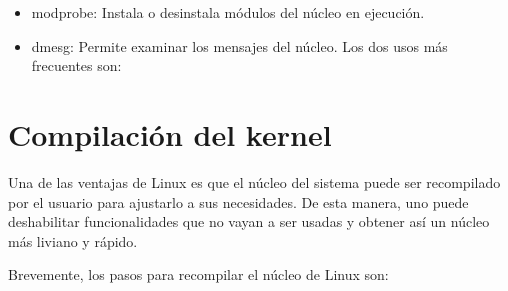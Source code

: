 \documentclass[12pt,a4paper,spanish]{article}
\begin{document}
\begin{itemize}
\item {modprobe}: Instala o desinstala módulos del núcleo en ejecución. 

\item {dmesg}: Permite examinar los mensajes del núcleo. Los dos usos más frecuentes son:

\end{itemize} 


\section{Compilación del kernel}

Una de las ventajas de Linux es que el núcleo del sistema puede ser recompilado por el usuario para ajustarlo a sus necesidades. De esta manera, uno puede deshabilitar funcionalidades que no vayan a ser usadas y obtener así un núcleo más liviano y rápido.

Brevemente, los pasos para recompilar el núcleo de Linux son:
\end{document}
